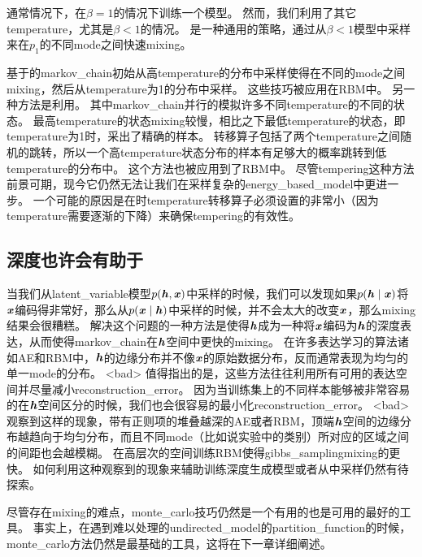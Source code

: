 通常情况下，在$\beta = 1$的情况下训练一个模型。
然而，我们利用了其它\gls{temperature}，尤其是$\beta < 1$的情况。
是一种通用的策略，通过从$\beta<1$模型中采样来在$p_1$的不同\gls{mode}之间快速\gls{mixing}。

基于\citep{Neal94b}的\gls{markov_chain}初始从高\gls{temperature}的分布中采样使得在不同的\gls{mode}之间\gls{mixing}，然后从\gls{temperature}为1的分布中采样。
这些技巧被应用在\gls{RBM}中\citep{Salakhutdinov-2010}。
另一种方法是利用\citep{Iba-2001}。
其中\gls{markov_chain}并行的模拟许多不同\gls{temperature}的不同的状态。
最高\gls{temperature}的状态\gls{mixing}较慢，相比之下最低\gls{temperature}的状态，即\gls{temperature}为1时，采出了精确的样本。
转移算子包括了两个\gls{temperature}之间随机的跳转，所以一个高\gls{temperature}状态分布的样本有足够大的概率跳转到低\gls{temperature}的分布中。
这个方法也被应用到了\gls{RBM}中\citep{Desjardins+al-2010-small,Cho10IJCNN}。
尽管\gls{tempering}这种方法前景可期，现今它仍然无法让我们在采样复杂的\gls{energy_based_model}中更进一步。
一个可能的原因是在时\gls{temperature}转移算子必须设置的非常小（因为\gls{temperature}需要逐渐的下降）来确保\gls{tempering}的有效性。



\subsection{深度也许会有助于}
\label{sec:depth_may_help_mixing}

当我们从\gls{latent_variable}模型$p(\boldsymbol{\mathit{h}},\boldsymbol{\mathit{x}})$中采样的时候，我们可以发现如果$p(\boldsymbol{\mathit{h}}\mid \boldsymbol{\mathit{x}})$将$\boldsymbol{\mathit{x}}$编码得非常好，那么从$p(\boldsymbol{\mathit{x}} \mid \boldsymbol{\mathit{h}})$中采样的时候，并不会太大的改变$\boldsymbol{\mathit{x}}$，那么\gls{mixing}结果会很糟糕。
解决这个问题的一种方法是使得$\boldsymbol{\mathit{h}}$成为一种将$\boldsymbol{\mathit{x}}$编码为$\boldsymbol{\mathit{h}}$的深度表达，从而使得\gls{markov_chain}在$\boldsymbol{\mathit{h}}$空间中更快的\gls{mixing}。
在许多表达学习的算法诸如\gls{AE}和\gls{RBM}中，$\boldsymbol{\mathit{h}}$的边缘分布并不像$\boldsymbol{\mathit{x}}$的原始数据分布，反而通常表现为均匀的单一\gls{mode}的分布。
<bad> 值得指出的是，这些方法往往利用所有可用的表达空间并尽量减小\gls{reconstruction_error}。
因为当训练集上的不同样本能够被非常容易的在$\boldsymbol{\mathit{h}}$空间区分的时候，我们也会很容易的最小化\gls{reconstruction_error}。
<bad> \citep{Bengio-et-al-ICML2013-small}观察到这样的现象，带有正则项的堆叠越深的\gls{AE}或者\gls{RBM}，顶端$\boldsymbol{\mathit{h}}$空间的边缘分布越趋向于均匀分布，而且不同\gls{mode}（比如说实验中的类别）所对应的区域之间的间距也会越模糊。
在高层次的空间训练\gls{RBM}使得\gls{gibbs_sampling}\gls{mixing}的更快。
如何利用这种观察到的现象来辅助训练深度生成模型或者从中采样仍然有待探索。

尽管存在\gls{mixing}的难点，\gls{monte_carlo}技巧仍然是一个有用的也是可用的最好的工具。
事实上，在遇到难以处理的\gls{undirected_model}的\gls{partition_function}的时候，\gls{monte_carlo}方法仍然是最基础的工具，这将在下一章详细阐述。












